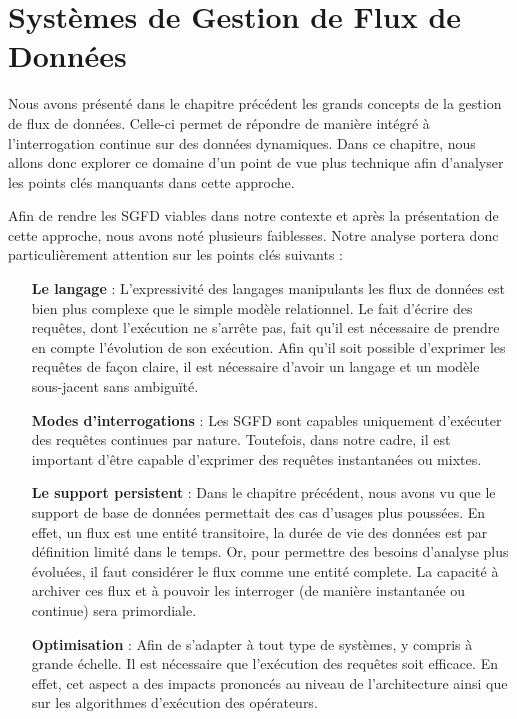
\chapter{Systèmes de Gestion de Flux de Données}
\chaptertoc
Nous avons présenté dans le chapitre précédent les grands concepts de la gestion de flux de données. Celle-ci permet de répondre de manière intégré à l'interrogation continue sur des données dynamiques. Dans ce chapitre, nous allons donc explorer ce domaine d'un point de vue plus technique afin d'analyser les points clés manquants dans cette approche.

Afin de rendre les SGFD viables dans notre contexte et après la présentation de cette approche, nous avons noté plusieurs faiblesses. Notre analyse portera donc particulièrement attention sur les points clés suivants : 
\begin{itemize}
	\item[\textbf{Le langage}] : L'expressivité des langages manipulants les flux de données est bien plus complexe que le simple modèle relationnel. Le fait d'écrire des requêtes, dont l'exécution ne s'arrête pas, fait qu'il est nécessaire de prendre en compte l'évolution de son exécution. Afin qu'il soit possible d'exprimer les requêtes de façon claire, il est nécessaire d'avoir un langage et un modèle sous-jacent sans ambiguïté.
	\item[\textbf{Modes d'interrogations}] : Les SGFD sont capables uniquement d'exécuter des requêtes continues par nature. Toutefois, dans notre cadre, il est important d'être capable d'exprimer des requêtes instantanées ou mixtes. 
	\item[\textbf{Le support persistent}] : Dans le chapitre précédent, nous avons vu que le support de base de données permettait des cas d'usages plus poussées. En effet, un flux est une entité transitoire, la durée de vie des données est par définition limité dans le temps. Or, pour permettre des besoins d'analyse plus évoluées, il faut considérer le flux comme une entité complete. La capacité à archiver ces flux et à pouvoir les interroger (de manière instantanée ou continue) sera primordiale.
	\item[\textbf{Optimisation}] : Afin de s'adapter à tout type de systèmes, y compris à grande échelle. Il est nécessaire que l'exécution des requêtes soit efficace. En effet, cet aspect a des impacts prononcés au niveau de l'architecture ainsi que sur les algorithmes d'exécution des opérateurs.
\end{itemize}

